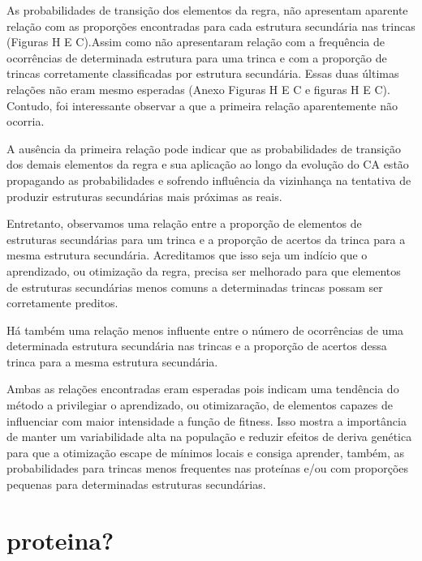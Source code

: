 As probabilidades de transição dos elementos da regra, não apresentam aparente relação com as proporções encontradas para cada estrutura secundária nas trincas (Figuras H E C).Assim como não apresentaram relação com a frequência de ocorrências de determinada estrutura para uma trinca e com a proporção de trincas corretamente classificadas por estrutura secundária. Essas duas últimas relações não eram mesmo esperadas (Anexo Figuras H E C e figuras H E C). Contudo, foi interessante observar a que a primeira relação aparentemente não ocorria. 

A ausência da primeira relação pode indicar que as probabilidades de transição dos demais elementos da regra e sua aplicação ao longo da evolução do CA estão propagando as probabilidades e sofrendo influência da vizinhança na tentativa de produzir estruturas secundárias mais próximas as reais. 

Entretanto, observamos uma relação entre a proporção de elementos de estruturas secundárias para um trinca e a proporção de acertos da trinca para a mesma estrutura secundária. Acreditamos que isso seja um indício que o aprendizado, ou otimização da regra, precisa ser melhorado para que elementos de estruturas secundárias menos comuns a determinadas trincas possam ser corretamente preditos.  

Há também uma relação menos influente entre o número de ocorrências de uma determinada estrutura secundária nas trincas e a proporção de acertos dessa trinca para a mesma estrutura secundária.

Ambas as relações encontradas eram esperadas pois indicam uma tendência do método a privilegiar o aprendizado, ou otimizaração, de elementos capazes de influenciar com maior intensidade a função de fitness. Isso mostra a importância de manter um variabilidade alta na população e reduzir efeitos de deriva genética para que a otimização escape de mínimos locais e consiga aprender, também, as probabilidades para trincas menos frequentes nas proteínas e/ou com proporções pequenas para determinadas estruturas secundárias.






\section{proteina?}















